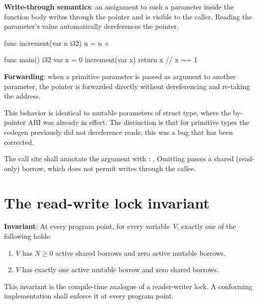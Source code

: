 \pnum
\textbf{Write-through semantics}: an assignment to such a parameter inside
the function body writes through the pointer and is visible to the caller.
Reading the parameter's value automatically dereferences the pointer.

\begin{example}
\begin{laincode}
func increment(var n i32) {
    n = n +%
}

func main() i32 {
    var x = 0
    increment(var x)
    return x     // x == 1
}
\end{laincode}
\end{example}

\pnum
\textbf{Forwarding}: when a  primitive parameter is passed as
argument to another  parameter, the pointer is forwarded
directly without dereferencing and re-taking the address.

\pnum
This behavior is identical to mutable parameters of struct type, where the
by-pointer ABI was already in effect.  The distinction is that for primitive
types the codegen previously did not dereference reads; this was a bug that
has been corrected.

\begin{note}
  The call site shall annotate the argument with :
  .  Omitting  passes a shared (read-only)
  borrow, which does not permit writes through the callee.
\end{note}

\section{The read-write lock invariant}
\label{sec:own.rwlock}

\pnum
\textbf{Invariant}: At every program point, for every variable~$V$, exactly
one of the following holds:
\begin{enumerate}
  \item $V$ has $N \geq 0$ active shared borrows and zero active mutable borrows.
  \item $V$ has exactly one active mutable borrow and zero shared borrows.
\end{enumerate}

\pnum
This invariant is the compile-time analogue of a reader-writer lock.  A
conforming implementation shall enforce it at every program point.

